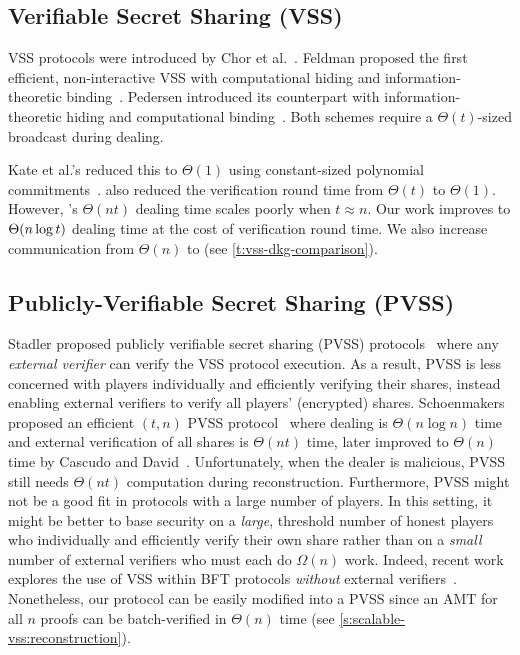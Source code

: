 \subsection{Verifiable Secret Sharing (VSS)}
\label{s:related-work:vss}
VSS protocols were introduced by Chor et al.~\cite{CGMA85}.
Feldman proposed the first efficient, non-interactive VSS with computational hiding and information-theoretic binding~\cite{Feldman87}.
Pedersen introduced its counterpart with information-theoretic hiding and computational binding~\cite{Pedersen1991Non}.
Both schemes require a $\Theta(t)$-sized broadcast during dealing.

Kate et al.'s \evss reduced this to $\Theta(1)$ using constant-sized polynomial commitments~\cite{KZG10a}.
\evss also reduced the verification round time from $\Theta(t)$ to $\Theta(1)$.
However, \evss's $\Theta(nt)$ dealing time scales poorly when $t\approx n$.
Our work improves \evss to $\Theta(n\log{t})$ dealing time at the cost of \amtOneShareVerifTime verification round time.
We also increase communication from $\Theta(n)$ to \amtAllShareVerifTime (see \cref{t:vss-dkg-comparison}).

\subsection{Publicly-Verifiable Secret Sharing (PVSS)}
\label{s:related-work:pvss}

Stadler proposed publicly verifiable secret sharing (PVSS) protocols~\cite{Stadler1996Publicly} where any \textit{external verifier} can verify the VSS protocol execution.
As a result, PVSS is less concerned with players individually and efficiently verifying their shares, instead enabling external verifiers to verify all players' (encrypted) shares.
Schoenmakers proposed an efficient $(t,n)$ PVSS protocol~\cite{Schoenmakers1999} where dealing is $\Theta(n\log{n})$ time and external verification of all shares is $\Theta(nt)$ time, later improved to $\Theta(n)$ time by Cascudo and David~\cite{CD17a}.
Unfortunately, when the dealer is malicious, PVSS still needs $\Theta(nt)$ computation during reconstruction.
Furthermore, PVSS might not be a good fit in protocols with a large number of players.
In this setting, it might be better to base security on a \textit{large}, threshold number of honest players who individually and efficiently verify their own share rather than on a \textit{small} number of external verifiers who must each do $\Omega(n)$ work.
Indeed, recent work explores the use of VSS within BFT protocols \textit{without} external verifiers~\cite{BTA+19}.
Nonetheless, our \ourvss protocol can be easily modified into a PVSS since an AMT for all $n$ proofs can be batch-verified in $\Theta(n)$ time (see \cref{s:scalable-vss:reconstruction}).

